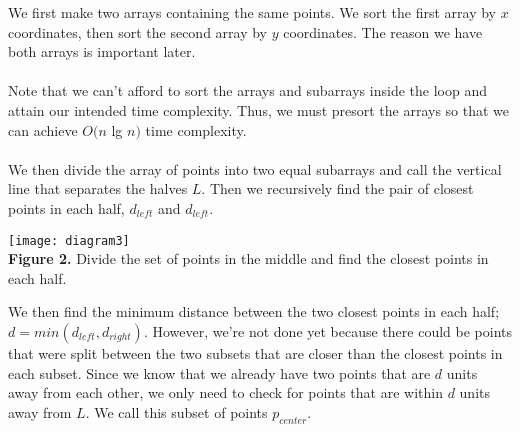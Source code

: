 \documentclass[12pt]{report}
\begin{document}
We first make two arrays containing the same points. We sort the first array by $x$ coordinates, then sort the second array by $y$ coordinates. The reason 
we have both arrays is important later.
\\\\
Note that we can't afford to sort the arrays and subarrays inside the loop and attain our intended time complexity. Thus, we must presort the arrays so that 
we can achieve $O(n$ lg $n)$ time complexity.
\\\\
We then divide the array of points into two equal subarrays and call the vertical line that separates the halves $L$. Then we recursively find the pair of closest 
points in each half, $d_{left}$ and $d_{left}$. 

\begin{center}
\texttt{[image: diagram3]}
\\\textbf{Figure 2.} Divide the set of points in the middle and find the closest points in each half.
\end{center}
We then find the minimum distance between the two closest points in each half; $d = min(d_{left}, d_{right})$. However, we’re not done yet because there could be 
points that were split between the two subsets that are closer than the closest points in each subset. Since we know that we already have two points that 
are $d$ units away from each other, we only need to check for points that are within $d$ units away from $L$. We call this subset of points $p_{center}$.
\end{document}
